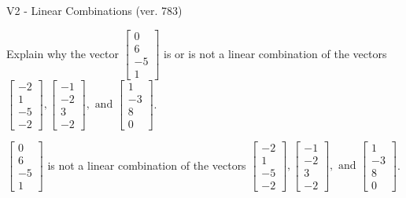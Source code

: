 \begin{exercise}
  \begin{exerciseTitle}V2 - Linear Combinations (ver. 783)\end{exerciseTitle}
  \begin{exerciseStatement}
    Explain why the vector \(\left[\begin{array}{c}
0 \\
6 \\
-5 \\
1
\end{array}\right]\)  is or is not a linear 
	combination of the vectors \(\left[\begin{array}{c}
-2 \\
1 \\
-5 \\
-2
\end{array}\right] , \left[\begin{array}{c}
-1 \\
-2 \\
3 \\
-2
\end{array}\right] , \text{ and } \left[\begin{array}{c}
1 \\
-3 \\
8 \\
0
\end{array}\right]\).
	


  \end{exerciseStatement}
  \begin{exerciseAnswer}
   \(\left[\begin{array}{c}
0 \\
6 \\
-5 \\
1
\end{array}\right]\) 
  	 is not  
	a linear combination of the vectors \(\left[\begin{array}{c}
-2 \\
1 \\
-5 \\
-2
\end{array}\right] , \left[\begin{array}{c}
-1 \\
-2 \\
3 \\
-2
\end{array}\right] , \text{ and } \left[\begin{array}{c}
1 \\
-3 \\
8 \\
0
\end{array}\right]\).

	
  


  \end{exerciseAnswer}
\end{exercise}